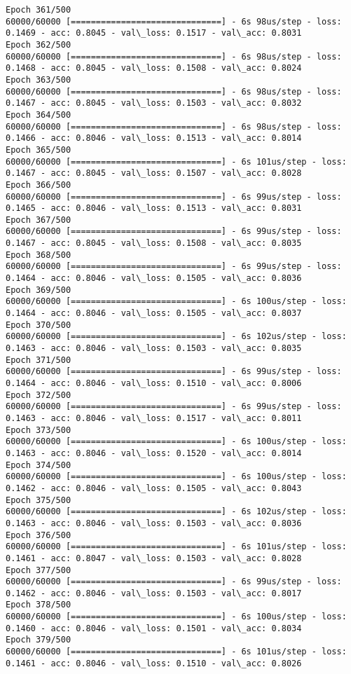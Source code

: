 \documentclass[11pt]{article}
\begin{document}
\begin{Verbatim}[commandchars=\\\{\}]
Epoch 361/500
60000/60000 [==============================] - 6s 98us/step - loss: 0.1469 - acc: 0.8045 - val\_loss: 0.1517 - val\_acc: 0.8031
Epoch 362/500
60000/60000 [==============================] - 6s 98us/step - loss: 0.1468 - acc: 0.8045 - val\_loss: 0.1508 - val\_acc: 0.8024
Epoch 363/500
60000/60000 [==============================] - 6s 98us/step - loss: 0.1467 - acc: 0.8045 - val\_loss: 0.1503 - val\_acc: 0.8032
Epoch 364/500
60000/60000 [==============================] - 6s 98us/step - loss: 0.1466 - acc: 0.8046 - val\_loss: 0.1513 - val\_acc: 0.8014
Epoch 365/500
60000/60000 [==============================] - 6s 101us/step - loss: 0.1467 - acc: 0.8045 - val\_loss: 0.1507 - val\_acc: 0.8028
Epoch 366/500
60000/60000 [==============================] - 6s 99us/step - loss: 0.1465 - acc: 0.8046 - val\_loss: 0.1513 - val\_acc: 0.8031
Epoch 367/500
60000/60000 [==============================] - 6s 99us/step - loss: 0.1467 - acc: 0.8045 - val\_loss: 0.1508 - val\_acc: 0.8035
Epoch 368/500
60000/60000 [==============================] - 6s 99us/step - loss: 0.1464 - acc: 0.8046 - val\_loss: 0.1505 - val\_acc: 0.8036
Epoch 369/500
60000/60000 [==============================] - 6s 100us/step - loss: 0.1464 - acc: 0.8046 - val\_loss: 0.1505 - val\_acc: 0.8037
Epoch 370/500
60000/60000 [==============================] - 6s 102us/step - loss: 0.1463 - acc: 0.8046 - val\_loss: 0.1503 - val\_acc: 0.8035
Epoch 371/500
60000/60000 [==============================] - 6s 99us/step - loss: 0.1464 - acc: 0.8046 - val\_loss: 0.1510 - val\_acc: 0.8006
Epoch 372/500
60000/60000 [==============================] - 6s 99us/step - loss: 0.1463 - acc: 0.8046 - val\_loss: 0.1517 - val\_acc: 0.8011
Epoch 373/500
60000/60000 [==============================] - 6s 100us/step - loss: 0.1463 - acc: 0.8046 - val\_loss: 0.1520 - val\_acc: 0.8014
Epoch 374/500
60000/60000 [==============================] - 6s 100us/step - loss: 0.1462 - acc: 0.8046 - val\_loss: 0.1505 - val\_acc: 0.8043
Epoch 375/500
60000/60000 [==============================] - 6s 102us/step - loss: 0.1463 - acc: 0.8046 - val\_loss: 0.1503 - val\_acc: 0.8036
Epoch 376/500
60000/60000 [==============================] - 6s 101us/step - loss: 0.1461 - acc: 0.8047 - val\_loss: 0.1503 - val\_acc: 0.8028
Epoch 377/500
60000/60000 [==============================] - 6s 99us/step - loss: 0.1462 - acc: 0.8046 - val\_loss: 0.1503 - val\_acc: 0.8017
Epoch 378/500
60000/60000 [==============================] - 6s 100us/step - loss: 0.1460 - acc: 0.8046 - val\_loss: 0.1501 - val\_acc: 0.8034
Epoch 379/500
60000/60000 [==============================] - 6s 101us/step - loss: 0.1461 - acc: 0.8046 - val\_loss: 0.1510 - val\_acc: 0.8026

\end{Verbatim}
\end{document}
